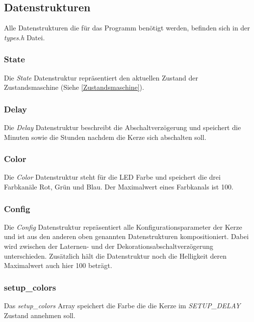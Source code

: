 \subsection{Datenstrukturen}\label{Datenstrukturen}
    Alle Datenstrukturen die für das Programm benötigt werden, befinden sich
    in der \textit{types.h} Datei.

    \subsubsection{State}
        Die \textit{State} Datenstruktur repräsentiert den aktuellen Zustand
        der Zustandsmaschine (Siehe \ref{Zustandsmaschine}).
        


    \subsubsection{Delay}
        Die \textit{Delay} Datenstruktur beschreibt die Abschaltverzögerung und
        speichert die Minuten sowie die Stunden nachdem die Kerze sich
        abschalten soll.
        


    \subsubsection{Color}
        Die \textit{Color} Datenstruktur steht für die LED Farbe und
        speichert die drei Farbkanäle Rot, Grün und Blau. Der Maximalwert
        eines Farbkanals ist 100.
        


    \subsubsection{Config}
        Die \textit{Config} Datenstruktur repräsentiert alle
        Konfigurationsparameter der Kerze und ist aus den anderen oben genannten
        Datenstrukturen kompositioniert.
        Dabei wird zwischen der Laternen- und der Dekorationsabschaltverzögerung
        unterschieden. Zusätzlich hält die Datenstruktur noch die Helligkeit
        deren Maximalwert auch hier 100 beträgt.
        

    
    \subsubsection{setup\_colors}
        Das \textit{setup\_colors} Array speichert die Farbe die die Kerze im
        \textit{SETUP\_DELAY} Zustand annehmen soll.
        


